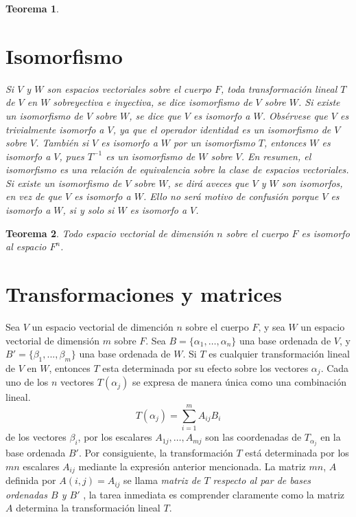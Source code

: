 \documentclass[b5paper, 11pt]{book}
\newcommand{\0}{\mathbf{0}}
\theoremstyle{estiloB}
\theoremstyle{estiloC}
\newtheorem{unteo}{Teorema}[chapter]
\theoremstyle{estiloD}
\theoremstyle{estiloE}
\begin{document}
\begin{unteo}
\section{Isomorfismo}
Si $V$ y $W$ son espacios vectoriales sobre el cuerpo $F$, toda transformaci\'on lineal $T$ de $V$ en $W$ sobreyectiva e inyectiva, se dice \textit{isomorfismo de $V$ sobre $W$}.
Si existe un isomorfismo de $V$ sobre $W$, se dice que $V$ es \textit{isomorfo} a $W$.
Obs\'ervese que $V$ es trivialmente isomorfo a $V$, ya que el operador identidad es un isomorfismo de $V$ sobre $V$. Tambi\'en si $V$ es isomorfo a $W$ por un isomorfismo $T$, entonces $W$ es isomorfo a $V$, pues $T^{-1}$ es un isomorfismo  de $W$ sobre $V$. En resumen, el isomorfismo es una relaci\'on de equivalencia sobre la clase de espacios vectoriales. Si existe un isomorfismo de $V$ sobre $W$, se dir\'a aveces que $V$ y $W$ son isomorfos, en vez de que $V$ es isomorfo a $W$. Ello no ser\'a motivo de confusi\'on porque $V$ es isomorfo a $W$, si y solo si $W$ es isomorfo a $V$.
\end{unteo}

\begin{unteo}
Todo espacio vectorial de dimensi\'on $n$ sobre el cuerpo $F$ es isomorfo al espacio $F^{n}$.
\end{unteo}

\section{Transformaciones y matrices}
Sea $V$ un espacio vectorial de dimenci\'on $n$ sobre el cuerpo $F$, y sea $W$ un espacio vectorial de dimensi\'on $m$ sobre $F$. Sea $B = \{\alpha_{1},\ldots ,\alpha_{n} \} $ una base ordenada de $V$, y $B' =\{\beta_{1},...,\beta_{m}\} $ una base ordenada de $W$. Si $T$ es cualquier transformaci\'on lineal de $V$ en $W$, entonces $T$ esta determinada por su efecto sobre los vectores $\alpha_{j}$. Cada uno de los $n$ vectores $T(\alpha_{j})$ se expresa de manera \'unica como una combinaci\'on lineal.
\[
T(\alpha_{j}) = \sum_{i=1}^{m}A_{ij}B_{i}
\]
de los vectores $\beta_{i}$, por los escalares $A_{1j}, \ldots , A_{mj}$ son las coordenadas de $T_{\alpha_{j}}$ en la base ordenada $B'$. Por consiguiente, la transformaci\'on $T$ est\'a determinada por los $mn$ escalares  $A_{ij}$ mediante la expresi\'on anterior mencionada. La matriz $mn$, $A$ definida por $A(i,j) = A_{ij}$ se llama \textit{matriz de $T$ respecto al par de bases ordenadas $B$ y $B'$ }, la tarea inmediata es comprender claramente como la matriz $A$ determina la transformaci\'on lineal $T$. 
\end{document}
